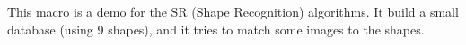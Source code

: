 This macro is a demo for the SR (Shape Recognition) algorithms.
It build a small database (using 9 shapes), and it tries
to match some images to the shapes.
